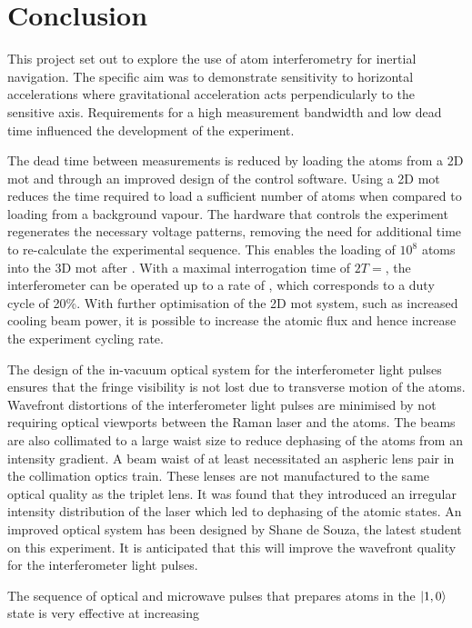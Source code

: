 \chapter{Conclusion}
This project set out to explore the use of atom interferometry for
inertial navigation. The specific aim was to demonstrate sensitivity
to horizontal accelerations where gravitational acceleration acts
perpendicularly to the sensitive axis. Requirements for a high
measurement bandwidth and low dead time influenced the development of
the experiment. \par\noindent
The dead time between measurements is reduced by
loading the atoms from a 2D \ac{mot} and through an improved design of
the control software. Using a 2D \ac{mot} reduces the time required to
load a sufficient number of atoms when compared to loading from a
background vapour. The hardware that controls the experiment
regenerates the necessary voltage patterns, removing the need for
additional time to
re-calculate the experimental sequence. This enables the loading of
$10^8$ atoms into the 3D \ac{mot} after . With a
maximal interrogation time of $2T = $, the
interferometer can be operated up to a rate of , which
corresponds to a duty cycle of 20\%. With further optimisation of the
2D \ac{mot} system, such as increased cooling beam power, it is
possible to increase the atomic flux and hence increase the experiment
cycling rate. 
\par\noindent
The design of the in-vacuum optical system for the interferometer
light pulses ensures that the fringe visibility is not lost due to
transverse motion of the atoms. Wavefront distortions
of the interferometer light pulses are minimised by not requiring
optical viewports between the Raman laser and the atoms. The beams
are also collimated to a large waist size to reduce dephasing of the
atoms from an intensity gradient. A beam waist of at least
 necessitated an aspheric lens pair in the
collimation optics train. These lenses are not manufactured to the same
optical quality as the triplet lens. It was found that they introduced
an irregular intensity distribution of the laser which led to
dephasing of the atomic states. An improved optical system has been
designed by Shane de Souza, the latest student on this experiment. It
is anticipated that this will improve the wavefront quality for the
interferometer light pulses.
\par\noindent
The sequence of optical and microwave pulses that prepares
atoms in the $\ket{1,0}$ state is very effective at increasing
